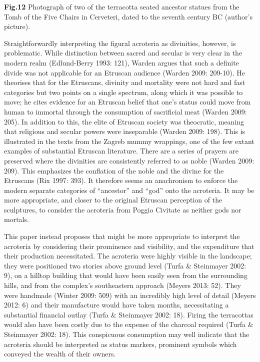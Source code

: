 \textbf{Fig.12} Photograph of two of the terracotta seated ancestor
statues from the Tomb of the Five Chairs in Cerveteri, dated to the
seventh century BC (author's picture).

Straightforwardly interpreting the figural acroteria as divinities,
however, is problematic. While distinction between sacred and secular is
very clear in the modern realm (Edlund-Berry 1993: 121), Warden argues
that such a definite divide was not applicable for an Etruscan audience
(Warden 2009: 209-10). He theorises that for the Etruscans, divinity and
mortality were not hard and fast categories but two points on a single
spectrum, along which it was possible to move; he cites evidence for an
Etruscan belief that one's status could move from human to immortal
through the consumption of sacrificial meat (Warden 2009: 205). In
addition to this, the elite of Etruscan society was theocratic, meaning
that religious and secular powers were inseparable (Warden 2009: 198).
This is illustrated in the texts from the Zagreb mummy wrappings, one of
the few extant examples of substantial Etruscan literature. There are a
series of prayers are preserved where the divinities are consistently
referred to as noble (Warden 2009: 209). This emphasizes the conflation
of the noble and the divine for the Etruscans (Rix 1997: 393). It
therefore seems an anachronism to enforce the modern separate categories
of ``ancestor'' and ``god'' onto the acroteria. It may be more
appropriate, and closer to the original Etruscan perception of the
sculptures, to consider the acroteria from Poggio Civitate as neither
gods nor mortals.

This paper instead proposes that might be more appropriate to interpret
the acroteria by considering their prominence and visibility, and the
expenditure that their production necessitated. The acroteria were
highly visible in the landscape; they were positioned two stories above
ground level (Turfa \& Steinmayer 2002: 9), on a hilltop building that
would have been easily seen from the surrounding hills, and from the
complex's southeastern approach (Meyers 2013: 52). They were handmade
(Winter 2009: 509) with an incredibly high level of detail (Meyers 2012:
6) and their manufacture would have taken months, necessitating a
substantial financial outlay (Turfa \& Steinmayer 2002: 18). Firing the
terracottas would also have been costly due to the expense of the
charcoal required (Turfa \& Steinmayer 2002: 18). This conspicuous
consumption may well indicate that the acroteria should be interpreted
as status markers, prominent symbols which conveyed the wealth of their
owners.

